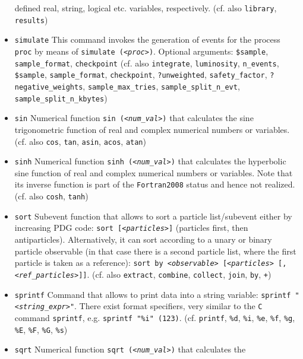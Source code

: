 \documentclass[12pt]{book}
\newcommand{\ttt}[1]{\texttt{#1}}
\begin{document}
\begin{itemize}
defined real, string, logical etc. variables, respectively.
(cf. also \ttt{library}, \ttt{results})
\item
\ttt{simulate} \newline
This command invokes the generation of events for the process
\ttt{proc} by means of \ttt{simulate ({\em <proc>})}.
Optional arguments: \ttt{\$sample}, \ttt{sample\_format},
\ttt{checkpoint} (cf. also \ttt{integrate}, \ttt{luminosity},
\ttt{n\_events}, \ttt{\$sample}, \ttt{sample\_format},
\ttt{checkpoint}, \ttt{?unweighted}, \ttt{safety\_factor},
\ttt{?negative\_weights}, \ttt{sample\_max\_tries},
\ttt{sample\_split\_n\_evt}, \ttt{sample\_split\_n\_kbytes})
\item
\ttt{sin} \newline
Numerical function \ttt{sin ({\em <num\_val>})} that calculates the
sine trigonometric function of real and complex numerical numbers or
variables. (cf. also \ttt{cos}, \ttt{tan}, \ttt{asin}, \ttt{acos},
\ttt{atan})
\item
\ttt{sinh} \newline
Numerical function \ttt{sinh ({\em <num\_val>})} that calculates the
hyperbolic sine function of real and complex numerical numbers or
variables. Note that its inverse function is part of the
\ttt{Fortran2008} status and hence not realized. (cf. also \ttt{cosh},
\ttt{tanh})
\item
\ttt{sort} \newline
Subevent function that allows to sort a particle list/subevent either
by increasing PDG code: \ttt{sort [{\em <particles>}]} (particles
first, then antiparticles). Alternatively, it can sort according to a
unary or binary particle observable (in that case there is a second
particle list, where the first particle is taken as a reference):
\ttt{sort by {\em <observable>} [{\em <particles>} [, {\em
<ref\_particles>}]]}. (cf. also \ttt{extract}, \ttt{combine},
\ttt{collect}, \ttt{join}, \ttt{by}, \ttt{+})
\item
\ttt{sprintf} \newline
Command that allows to print data into a string variable: \ttt{sprintf
"{\em <string\_expr>}"}. There exist format specifiers, very similar
to the \ttt{C} command \ttt{sprintf}, e.g. \ttt{sprintf "\%i"
(123)}. (cf. \ttt{printf}, \ttt{\%d}, \ttt{\%i}, \ttt{\%e},
\ttt{\%f}, \ttt{\%g}, \ttt{\%E}, \ttt{\%F}, \ttt{\%G}, \ttt{\%s})
\item
\ttt{sqrt} \newline
Numerical function \ttt{sqrt ({\em <num\_val>})} that calculates the

\end{itemize}
\end{document}
